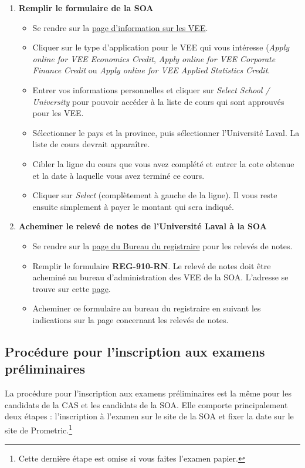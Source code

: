 \documentclass[11pt,french]{article}
\begin{document}
\begin{enumerate}
\item \textbf{Remplir le formulaire de la SOA}
\begin{itemize}
\item Se rendre sur la \href{https://soa.org/education/exam-req/edu-vee.aspx}{page d'information sur les VEE}. 
\item Cliquer sur le type d'application pour le VEE qui vous intéresse (\textit{Apply online for VEE Economics Credit}, \textit{Apply online for VEE Corporate Finance Credit} ou \textit{Apply online for VEE Applied Statistics Credit}.
\item Entrer vos informations personnelles et cliquer sur \textit{Select School / University} pour pouvoir accéder à la liste de cours qui sont approuvés pour les VEE.
\item Sélectionner le pays et la province, puis sélectionner l'Université Laval. La liste de cours devrait apparaître. \item Cibler la ligne du cours que vous avez complété et entrer la cote obtenue et la date à laquelle vous avez terminé ce cours. 
\item Cliquer sur \textit{Select} (complètement à gauche de la ligne). Il vous reste ensuite simplement à payer le montant qui sera indiqué.
\end{itemize}\vspace{\baselineskip}
\item \textbf{Acheminer le relevé de notes de l'Université Laval à la SOA}
\begin{itemize}
\item Se rendre sur la \href{https://www.reg.ulaval.ca/cms/DemDoc/releveNotes}{page du Bureau du registraire} pour les relevés de notes.
\item Remplir le formulaire \textbf{REG-910-RN}. Le relevé de notes doit être acheminé au bureau d'administration des VEE de la SOA. L'adresse se trouve sur cette \href{https://soa.org/education/exam-req/course-info/edu-vee-applying-process.aspx}{page}.
\item Acheminer ce formulaire au bureau du registraire en suivant les indications sur la page concernant les relevés de notes.
\end{itemize}
\end{enumerate}


\newpage
\subsection*{Procédure pour l'inscription aux examens préliminaires}
\label{subsec:inscriptionexams}
La procédure pour l'inscription aux examens préliminaires est la même pour les candidats de la CAS et les candidats de la SOA. Elle comporte principalement deux étapes : l'inscription à l'examen sur le site de la SOA et fixer la date sur le site de Prometric.\footnote{Cette dernière étape est omise si vous faites l'examen papier.}\vspace{\baselineskip} 
\end{document}
